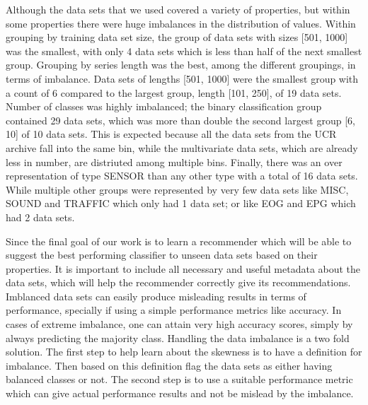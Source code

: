 Although the data sets that we used covered a variety of properties, but within some properties there were huge imbalances in the distribution of values.
Within grouping by training data set size, the group of data sets with sizes [501, 1000] was the smallest, with only 4 data sets which is less than half of the next smallest group.
Grouping by series length was the best, among the different groupings, in terms of imbalance. Data sets of lengths [501, 1000] were the smallest group with a count of 6 compared to the largest group, length [101, 250], of 19 data sets.
Number of classes was highly imbalanced; the binary classification group contained 29 data sets, which was more than double the second largest group [6, 10] of 10 data sets.
This is expected because all the data sets from the UCR archive fall into the same bin, while the multivariate data sets, which are already less in number, are distriuted among multiple bins.
Finally, there was an over representation of type SENSOR than any other type with a total of 16 data sets.
While multiple other groups were represented by very few data sets like MISC, SOUND and TRAFFIC which only had 1 data set; or like EOG and EPG which had 2 data sets.


Since the final goal of our work is to learn a recommender which will be able to suggest the best performing classifier to unseen data sets based on their properties.
It is important to include all necessary and useful metadata about the data sets, which will help the recommender correctly give its recommendations.
Imblanced data sets can easily produce misleading results in terms of performance, specially if using a simple performance metrics like accuracy.
In cases of extreme imbalance, one can attain very high accuracy scores, simply by always predicting the majority class.
Handling the data imbalance is a two fold solution.
The first step to help learn about the skewness is to have a definition for imbalance. Then based on this definition flag the data sets as either having balanced classes or not.
The second step is to use a suitable performance metric which can give actual performance results and not be mislead by the imbalance.

